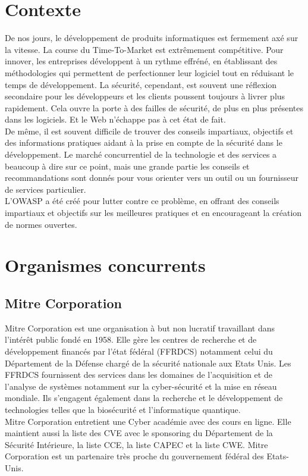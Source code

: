 \section{Contexte}
De nos jours, le développement de produits informatiques est fermement axé sur la vitesse. La course du Time-To-Market est extrêmement compétitive. Pour innover, les entreprises développent à un rythme effréné, en établissant des méthodologies qui permettent de perfectionner leur logiciel tout en réduisant le temps de développement. La sécurité, cependant, est souvent une réflexion secondaire pour les développeurs et les clients poussent toujours à livrer plus rapidement. Cela ouvre la porte à des failles de sécurité, de plus en plus présentes dans les logiciels. Et le Web n’échappe pas à cet état de fait.\\ 
De même, il est souvent difficile de trouver des conseils impartiaux, objectifs et des informations pratiques aidant à la prise en compte de la sécurité dans le développement. Le marché concurrentiel de la technologie et des services a beaucoup à dire sur ce point, mais une grande partie les conseils et recommandations sont donnés pour vous orienter vers un outil ou un fournisseur de services particulier.\\
L'OWASP a été créé pour lutter contre ce problème, en offrant des conseils impartiaux et objectifs sur les meilleures pratiques et en encourageant la création de normes ouvertes.

\section{Organismes concurrents}
\subsection{Mitre Corporation}
Mitre Corporation est une organisation à but non lucratif travaillant dans l’intérêt public fondé en 1958. Elle gère les centres de recherche et de développement financés par l’état fédéral (FFRDCS) notamment celui du Département de la Défense chargé de la sécurité nationale aux Etats Unis. Les FFRDCS fournissent des services dans les domaines de l'acquisition et de l'analyse de systèmes notamment sur la cyber-sécurité et la mise en réseau mondiale. Ils s'engagent également dans la recherche et le développement de technologies telles que la biosécurité et l'informatique quantique.\\
Mitre Corporation entretient une Cyber académie avec des cours en ligne. Elle maintient aussi la liste des CVE avec le sponsoring du Département de la Sécurité Intérieure, la liste CCE, la liste CAPEC et la liste CWE. Mitre Corporation est un partenaire très proche du gouvernement fédéral des Etats-Unis.\\

